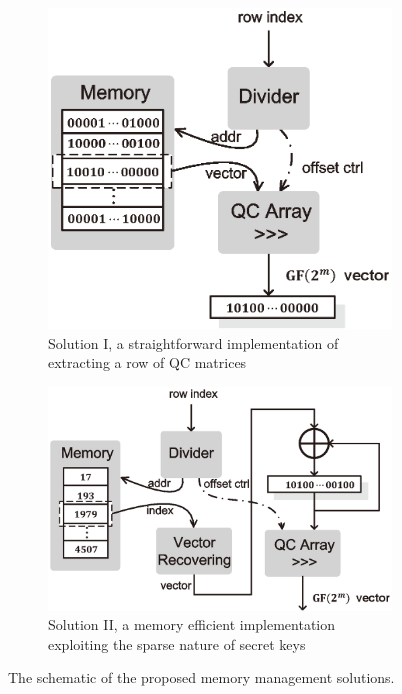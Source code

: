 \documentclass[10pt,journal,compsoc]{IEEEtran}
\begin{document}
\begin{figure}[!htb]
\centering
\begin{subfigure}{.35\textwidth}\centering
\includegraphics[width=\textwidth]{./fig/memsol1.eps}
\caption{Solution I, a straightforward implementation of extracting a row of QC matrices}
\end{subfigure}
\hfill
\begin{subfigure}{.45\textwidth}\centering
\includegraphics[width=\textwidth]{./fig/memsol2.eps}
\caption{Solution II, a memory efficient implementation exploiting the sparse nature of secret keys}
\end{subfigure}
\caption{The schematic of the proposed memory management solutions.}
\label{fig:memsol}
\end{figure}
\end{document}
